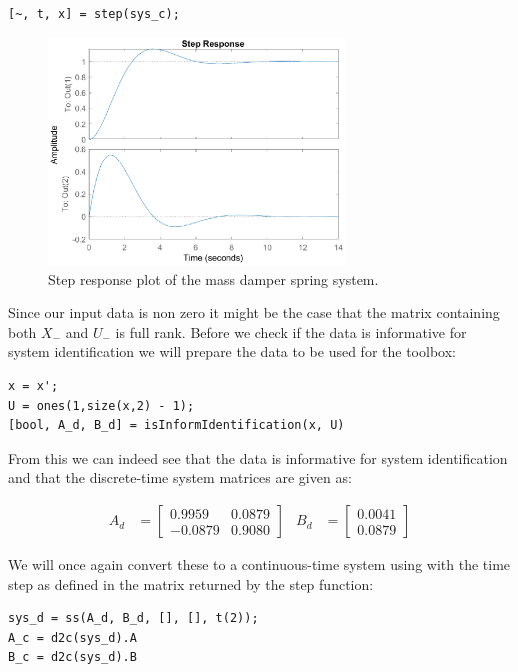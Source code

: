 \begin{lstlisting}
[~, t, x] = step(sys_c);
\end{lstlisting}

\begin{figure}[H]
	\centering
	\includegraphics[width=0.7\textwidth]{step_response_msd.eps}
	\caption{Step response plot of the mass damper spring system.}
\end{figure}

Since our input data is non zero it might be the case that the matrix containing both $X_-$ and $U_-$ is full rank. Before we check if the data is informative for system identification we will prepare the data to be used for the toolbox:

\begin{lstlisting}
x = x';
U = ones(1,size(x,2) - 1);
[bool, A_d, B_d] = isInformIdentification(x, U)
\end{lstlisting}

From this we can indeed see that the data is informative for system identification and that the discrete-time system matrices are given as:

\begin{align*}
	A_d &= \begin{bmatrix} 0.9959 & 0.0879 \\ -0.0879 & 0.9080 \end{bmatrix} &
	B_d &= \begin{bmatrix} 0.0041 \\ 0.0879 \end{bmatrix} 
\end{align*}

We will once again convert these to a continuous-time system using  with the time step as defined in the  matrix returned by the step function:

\begin{lstlisting}
sys_d = ss(A_d, B_d, [], [], t(2));
A_c = d2c(sys_d).A
B_c = d2c(sys_d).B
\end{lstlisting}

